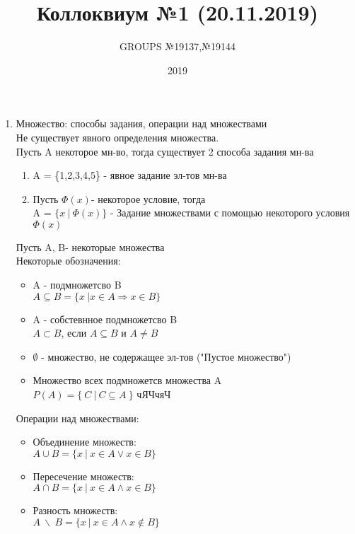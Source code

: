 \documentclass{article}
\title{ Коллоквиум №1 (20.11.2019) }
\author{GROUPS №19137,№19144}
\date{2019\\}
\begin{document}
  \maketitle
  \begin{enumerate}
    \item Множество: способы задания, операции над множествами
    \\ Не существует явного определения множества.
    \\ Пусть A некоторое мн-во, тогда существует 2 способа задания мн-ва
          \begin{enumerate}
          \item A = \{1,2,3,4,5\} - явное задание эл-тов мн-ва \\
          \item Пусть $\Phi(x)$- некоторое условие, тогда \\A = $\{x \ | \ \Phi(x) \}$ - Задание множествами с помощью некоторого условия $\Phi(x)$
          \end{enumerate}
      Пусть A, B- некоторые множества \\
      Некоторые обозначения:
      \begin{itemize}
          \item A - подмножетсво B \\
          $A \subseteq B = \{x \ | x\in{A} \Rightarrow x\in{B} \}$
          \item A - собстевнное подмножетсво B \\
          $A \subset B$, если $A \subseteq B$ и $A\ne{B} $
          \item $\emptyset$ - множество, не содержащее эл-тов ("Пустое множество")
          \item Множество всех подмножетсв множества A
          \\ $P(A) = \{ \ C\ |\ C \subseteq{A} \ \} $
чЯЧчяЧ
      \end{itemize}
      Операции над множествами:
      \begin{itemize}
        \item Объединение множеств:
        \\ $A\cup{B} = \{ x \ | \ x \in{A} \lor x\in{B}\}$
        \item Пересечение множеств:
        \\ $A\cap{B} = \{ x \ | \ x \in{A} \land x\in{B}\}$
        \item Разность множеств:
        \\ $A \ \backslash\  B = \{x\ | \ x\in{A} \land x\notin{B} \}$
      \end{itemize}
  \end{enumerate}
\end{document}
